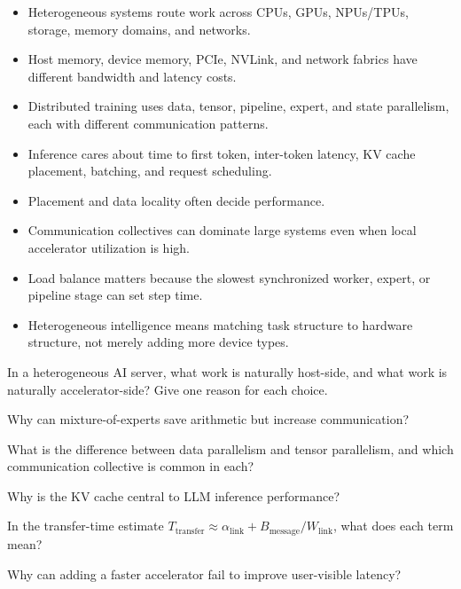 \begin{chaptersummary}
\begin{itemize}[leftmargin=*]
  \item Heterogeneous systems route work across CPUs, GPUs, NPUs/TPUs, storage, memory domains, and networks.
  \item Host memory, device memory, PCIe, NVLink, and network fabrics have different bandwidth and latency costs.
  \item Distributed training uses data, tensor, pipeline, expert, and state parallelism, each with different communication patterns.
  \item Inference cares about time to first token, inter-token latency, KV cache placement, batching, and request scheduling.
  \item Placement and data locality often decide performance.
  \item Communication collectives can dominate large systems even when local accelerator utilization is high.
  \item Load balance matters because the slowest synchronized worker, expert, or pipeline stage can set step time.
  \item Heterogeneous intelligence means matching task structure to hardware structure, not merely adding more device types.
\end{itemize}
\end{chaptersummary}

\begin{conceptquestions}
\item In a heterogeneous AI server, what work is naturally host-side, and what work is naturally accelerator-side? Give one reason for each choice.
\item Why can mixture-of-experts save arithmetic but increase communication?
\item What is the difference between data parallelism and tensor parallelism, and which communication collective is common in each?
\item Why is the KV cache central to LLM inference performance?
\item In the transfer-time estimate \(T_{\text{transfer}} \approx \alpha_{\text{link}} + B_{\text{message}}/W_{\text{link}}\), what does each term mean?
\item Why can adding a faster accelerator fail to improve user-visible latency?
\end{conceptquestions}

